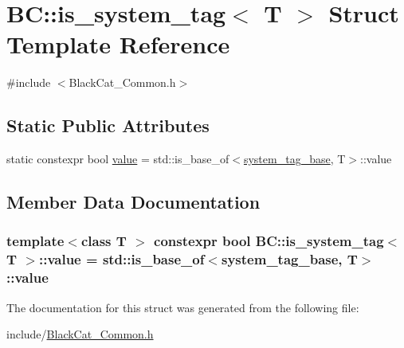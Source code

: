 \hypertarget{structBC_1_1is__system__tag}{}\section{BC\+:\+:is\+\_\+system\+\_\+tag$<$ T $>$ Struct Template Reference}
\label{structBC_1_1is__system__tag}


{\ttfamily \#include $<$Black\+Cat\+\_\+\+Common.\+h$>$}

\subsection*{Static Public Attributes}
\begin{DoxyCompactItemize}
\item 
static constexpr bool \hyperlink{structBC_1_1is__system__tag_a14ff96ad87d14d864d7589e90a0f619f}{value} = std\+::is\+\_\+base\+\_\+of$<$\hyperlink{classBC_1_1system__tag__base}{system\+\_\+tag\+\_\+base}, T$>$\+::value
\end{DoxyCompactItemize}


\subsection{Member Data Documentation}
\subsubsection[{\texorpdfstring{value}{value}}]{\setlength{\rightskip}{0pt plus 5cm}template$<$class T $>$ constexpr bool {\bf B\+C\+::is\+\_\+system\+\_\+tag}$<$ T $>$\+::value = std\+::is\+\_\+base\+\_\+of$<${\bf system\+\_\+tag\+\_\+base}, T$>$\+::value\hspace{0.3cm}{\ttfamily [static]}}\hypertarget{structBC_1_1is__system__tag_a14ff96ad87d14d864d7589e90a0f619f}{}\label{structBC_1_1is__system__tag_a14ff96ad87d14d864d7589e90a0f619f}


The documentation for this struct was generated from the following file\+:\begin{DoxyCompactItemize}
\item 
include/\hyperlink{BlackCat__Common_8h}{Black\+Cat\+\_\+\+Common.\+h}\end{DoxyCompactItemize}
